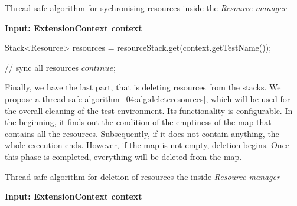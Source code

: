 \begin{algorithm}[H]
    \caption{Thread-safe algorithm for sychronising resources inside the \emph{Resource manager}}
    \label{04:alg:syncresources}
    \hspace*{\algorithmicindent} \textbf{Input: ExtensionContext context}
    \begin{algorithmic}[1]
        \State Stack<Resource> resources = resourceStack.get(context.getTestName());
        \State

        \State // sync all resources
            \State $continue;$
        \EndIf

        \State

        \EndForEach
    \end{algorithmic}
\end{algorithm}

Finally, we have the last part, that is deleting resources from the stacks.
We propose a thread-safe algorithm~\ref{04:alg:deleteresources}, which will be used for the overall cleaning of the test environment.
Its functionality is configurable.
In the beginning, it finds out the condition of the emptiness of the map that contains all the resources.
Subsequently, if it does not contain anything, the whole execution ends.
However, if the map is not empty, deletion begins.
Once this phase is completed, everything will be deleted from the map.

\begin{algorithm}[H]
    \caption{Thread-safe algorithm for deletion of resources the inside \emph{Resource manager}}
    \label{04:alg:deleteresources}
    \hspace*{\algorithmicindent} \textbf{Input: ExtensionContext context}
    \begin{algorithmic}[1]

        \If{$\Psi$}
        \EndIf
        \While {$!\Psi$}
        \EndWhile

    \end{algorithmic}
\end{algorithm}

